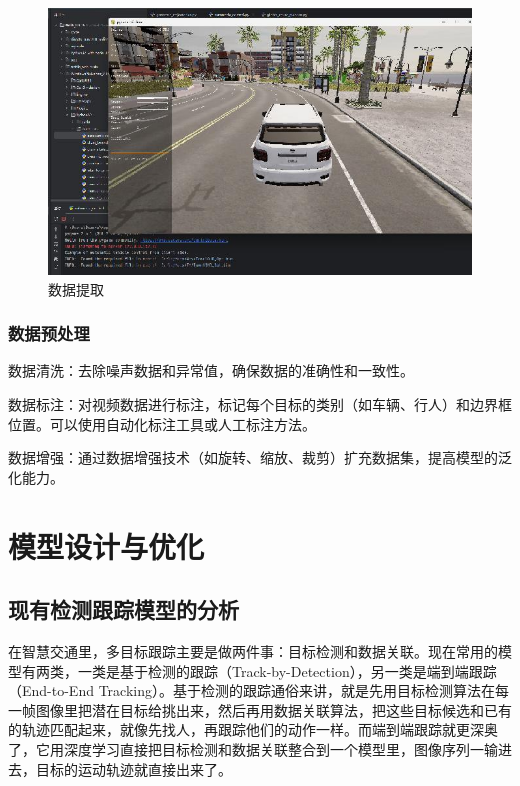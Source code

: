 \begin{figure}[htbp] %
	\centering
	\includegraphics[width=1\textwidth]{p29} %
	\caption{数据提取} %
	\label{fig:p29} %
\end{figure}



\subsubsection{数据预处理}

数据清洗：去除噪声数据和异常值，确保数据的准确性和一致性。

数据标注：对视频数据进行标注，标记每个目标的类别（如车辆、行人）和边界框位置。可以使用自动化标注工具或人工标注方法。

数据增强：通过数据增强技术（如旋转、缩放、裁剪）扩充数据集，提高模型的泛化能力。

\section{模型设计与优化}



\subsection{现有检测跟踪模型的分析}


在智慧交通里，多目标跟踪主要是做两件事：目标检测和数据关联。现在常用的模型有两类，一类是基于检测的跟踪（Track-by-Detection），另一类是端到端跟踪（End-to-End Tracking）。基于检测的跟踪通俗来讲，就是先用目标检测算法在每一帧图像里把潜在目标给挑出来，然后再用数据关联算法，把这些目标候选和已有的轨迹匹配起来，就像先找人，再跟踪他们的动作一样。而端到端跟踪就更深奥了，它用深度学习直接把目标检测和数据关联整合到一个模型里，图像序列一输进去，目标的运动轨迹就直接出来了。


